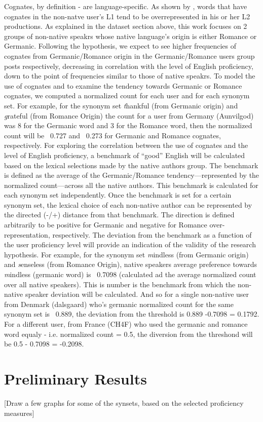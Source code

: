 \documentclass[11pt]{article}
\begin{document}
Cognates, by definition - are language-specific. As shown by \citet{TACL1403}, words that have  cognates in the non-natve user's L1 tend to be overrepresented in his or her L2 productions. As explained in the dataset section above, this work focuses on 2 groups of non-native speakrs whose native language's origin is either Romance or Germanic. Following the hypothesis, we expect to see higher frequencies of cognates from Germanic/Romance origin in the Germanic/Romance users group posts respectively, decreasing in correlation with the level of English proficiency, down to the point of frequencies similar to those of native speakrs.
To model the use of cognates and to examine the tendency towards Germanic or Romance cognates, we computed a normalized count for each user and for each synonym set. 
For example, for the synonym set \emph  thankful (from Germanic origin) and \emph grateful (from Romance Origin)   the count for a  user from Germany (Aunvilgod) was 8 for the Germanic word and 3 for the Romance word, then the normalized count will be ~0.727 and ~0.273 for Germanic and Romance cognates, respectively.
For exploring the correlation between the use of cognates and the level of English proficiency, a benchmark of ``good'' English will be calculated based on the lexical selections made by the native authors group. The benchmark is defined as the average of the Germanic/Romance tendency---represented by the normalized count---across all the native authors. This benchmark is calculated for each synonym set independently. 
Once the benchmark is set for a certain synonym set, the lexical choice of each non-native author can be represented by the directed (-/+) distance from that benchmark. The direction is defined arbitrarily to be positive for Germanic and negative for Romance over-representation, respectively.  The deviation from the benchmark as a function of the user proficiency level will provide an indication of the validity of the research hypothesis. 
For example, for the synonym set \emph mindless (from Germanic origin) and \emph senseless (from Romance Origin), native speakers average preference towards \emph mindless (germanic word) is ~0.7098 (calculated ad the average normalized count over all native speakers). This is number is the benchmark from which the non-native speaker deviation will be calculated. And so for a single non-native user from Denmark (dalsgaard) who's germanic normalized count for the same synonym set is ~0.889, the deviation from the threshold is 0.889 -0.7098 = 0.1792. For a different user, from France (CH4F) who used the germanic and romance word equaly - i.e. normalized count = 0.5, the diversion from the threshond will be 0.5 - 0.7098  = -0.2098.



\section{Preliminary Results}

[Draw a few graphs for some of the synsets, based on the selected proficiency measures]




\end{document}
